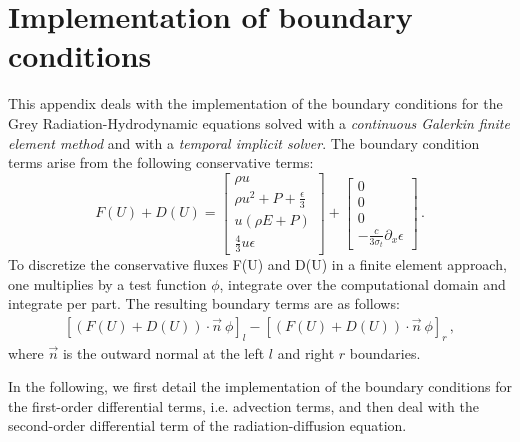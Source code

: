 \section{Implementation of boundary conditions} \label{App:AppendixA}
This appendix deals with the implementation of the boundary conditions for the Grey Radiation-Hydrodynamic equations solved with a \emph{continuous Galerkin finite element method} and with a \emph{temporal implicit solver}. The boundary condition terms arise from the following conservative terms:
%
\begin{equation}\label{eq:bc-fluxes}
F(U) + D(U) = 
\begin{bmatrix}
\rho u \\
\rho u^2 + P + \frac{\epsilon}{3} \\
u \left( \rho E + P \right) \\
\frac{4}{3} u \epsilon
\end{bmatrix}
+  
\begin{bmatrix}
0 \\
0 \\
0 \\
- \frac{c}{3 \sigma_t} \partial_x \epsilon
\end{bmatrix}
\,.
\end{equation}
%
To discretize the conservative fluxes F(U) and D(U) in a finite element approach, one multiplies by a test function $\phi$, integrate over the computational domain and integrate per part. The resulting boundary terms are as follows:
%
\begin{eqnarray}
\left[\left(F(U)+D(U)\right) \cdot \vec{n} \ \phi \right]_{l} - \left[ \left(F(U)+D(U)\right) \cdot \vec{n} \ \phi \right]_{r} \, ,
\end{eqnarray}
%
where $\vec{n}$ is the outward normal at the left $l$ and right $r$ boundaries.

In the following, we first detail the implementation of the boundary conditions for the first-order differential terms, i.e. advection terms, and then deal with the second-order differential term of the radiation-diffusion equation. 
%
%

